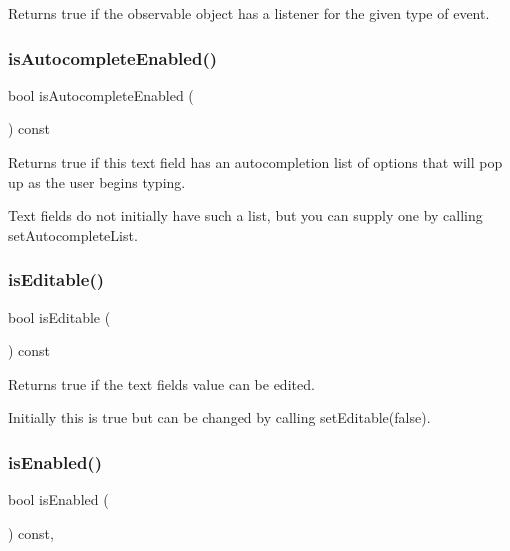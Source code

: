 Returns true if the observable object has a listener for the given type of event. 

\mbox{\label{classGTextField_a7528cfb0542ac5268efe1d7362b89344}} 
\subsubsection{\texorpdfstring{is\+Autocomplete\+Enabled()}{isAutocompleteEnabled()}}
{\footnotesize\ttfamily bool is\+Autocomplete\+Enabled (\begin{DoxyParamCaption}{ }\end{DoxyParamCaption}) const\hspace{0.3cm}{\ttfamily [virtual]}}



Returns true if this text field has an autocompletion list of options that will pop up as the user begins typing. 

Text fields do not initially have such a list, but you can supply one by calling set\+Autocomplete\+List. \mbox{\label{classGTextField_a012b5afb54e037e6c5498cf0932a521b}} 
\subsubsection{\texorpdfstring{is\+Editable()}{isEditable()}}
{\footnotesize\ttfamily bool is\+Editable (\begin{DoxyParamCaption}{ }\end{DoxyParamCaption}) const\hspace{0.3cm}{\ttfamily [virtual]}}



Returns true if the text field\textquotesingle{}s value can be edited. 

Initially this is true but can be changed by calling set\+Editable(false). \mbox{\label{classGInteractor_aacb819fb241851fd9fc045271baa4034}} 
\subsubsection{\texorpdfstring{is\+Enabled()}{isEnabled()}}
{\footnotesize\ttfamily bool is\+Enabled (\begin{DoxyParamCaption}{ }\end{DoxyParamCaption}) const\hspace{0.3cm}{\ttfamily [virtual]}, {\ttfamily [inherited]}}



